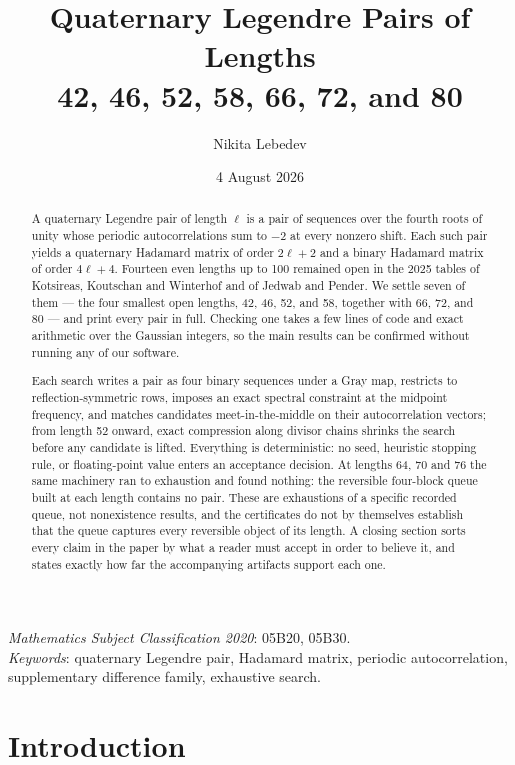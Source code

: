 \documentclass[11pt]{article}
\title{Quaternary Legendre Pairs of Lengths\\42, 46, 52, 58, 66, 72, and 80}
\author{Nikita Lebedev}
\date{4 August 2026}
\begin{document}
\maketitle

\begin{abstract}
A quaternary Legendre pair of length $\ell$ is a pair of sequences over the
fourth roots of unity whose periodic autocorrelations sum to $-2$ at every
nonzero shift.  Each such pair yields a quaternary Hadamard matrix of order
$2\ell+2$ and a binary Hadamard matrix of order $4\ell+4$.  Fourteen even
lengths up to 100 remained open in the 2025 tables of Kotsireas, Koutschan and
Winterhof and of Jedwab and Pender.  We settle seven of them --- the four
smallest open lengths, 42, 46, 52, and 58, together with 66, 72, and 80 ---
and print every pair in full.  Checking one takes
a few lines of code and exact arithmetic over the Gaussian integers, so the
main results can be confirmed without running any of our software.

Each search writes a pair as four binary sequences under a Gray map,
restricts to reflection-symmetric rows, imposes an exact spectral constraint
at the midpoint frequency, and matches candidates meet-in-the-middle on their
autocorrelation vectors; from length 52 onward, exact compression along
divisor chains shrinks the search before any candidate is lifted.  Everything
is deterministic: no seed, heuristic stopping rule, or floating-point value
enters an acceptance decision.  At lengths 64, 70 and 76 the same machinery ran to exhaustion and
found nothing: the reversible four-block queue built at each length contains
no pair.  These are exhaustions of a specific recorded queue, not nonexistence
results, and the certificates do not by themselves establish that the queue
captures every reversible object of its length.  A closing section sorts every
claim in the paper by what a reader
must accept in order to believe it, and states exactly how far the
accompanying artifacts support each one.
\end{abstract}

\medskip
\noindent\textit{Mathematics Subject Classification 2020}: 05B20, 05B30.\\
\textit{Keywords}: quaternary Legendre pair, Hadamard matrix, periodic
autocorrelation, supplementary difference family, exhaustive search.

\section{Introduction}
\end{document}
